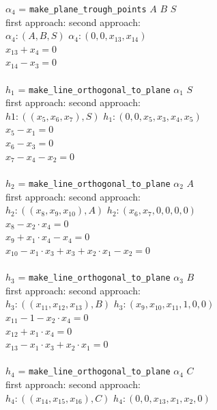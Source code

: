 \documentclass[final,1p,times,authoryear]{elsarticle}
\begin{document}
\begin{footnotesize}
\begin{tabbing}
\> $\alpha_4$ = {\tt make\_plane\_trough\_points} $A$ $B$ $S$ \\
\>\> first approach: \>\> second approach: \\
\>\> $\alpha_4: (A, B, S)$ \>\> $\alpha_4 : (0, 0, x_{13}, x_{14})$ \\
  \>\> \>\> $x_{13}  +  x_4 = 0$ \\
 \>\> \>\>  $x_{14}  -  x_3 = 0$ \\
 \\
\> $h_1$ = {\tt make\_line\_orthogonal\_to\_plane} $\alpha_1$ $S$ \\
\>\> first approach: \>\>second approach: \\
\>\> $h1: ((x_5, x_6, x_7), S) $ \>\>$h_1: (0, 0, x_5, x_3, x_4, x_5)$ \\
\>\> $x_5 - x_1 = 0$ \\
\>\> $x_6  -  x_3 = 0$ \\
\>\> $x_7  -  x_4  -  x_2 = 0$ \\
\\
\> $h_2$ = {\tt make\_line\_orthogonal\_to\_plane} $\alpha_2$ $A$ \\
\>\> first approach: \>\>second approach: \\
\>\> $h_2 : ((x_8, x_9, x_{10}), A)$ \>\>$h_2: (x_6, x_7, 0, 0, 0, 0) $ \\
\>\> $x_8  -  x_2\cdot x_4 = 0$ \\
\>\> $x_9  +  x_1\cdot x_4  -  x_4 = 0$ \\
\>\> $x_{10}  -  x_1\cdot x_3  +  x_3  +  x_2\cdot x_1  -  x_2 = 0$ \\
\\
\> $h_3$ = {\tt make\_line\_orthogonal\_to\_plane} $\alpha_3$ $B$ \\
\>\> first approach: \>\>second approach: \\
\>\> $h_3 : ((x_{11}, x_{12}, x_{13}), B)$ \>\>$h_3: (x_9, x_{10}, x_{11}, 1, 0, 0)$ \\
\>\> $x_{11}  -1  -  x_2\cdot x_4 = 0$ \\
\>\> $x_{12}  +  x_1\cdot x_4 = 0$ \\
\>\> $x_{13}  -  x_1\cdot x_3  +  x_2\cdot x_1 = 0$ \\
\\
\> $h_4$ = {\tt make\_line\_orthogonal\_to\_plane} $\alpha_4$ $C$ \\
\>\> first approach: \>\> second approach: \\
\>\> $h_4 : ((x_{14}, x_{15}, x_{16}), C) $ \>\>$h_4: (0, 0, x_{13}, x_1, x_2, 0)$ \\

\end{tabbing}
\end{footnotesize}
\end{document}
